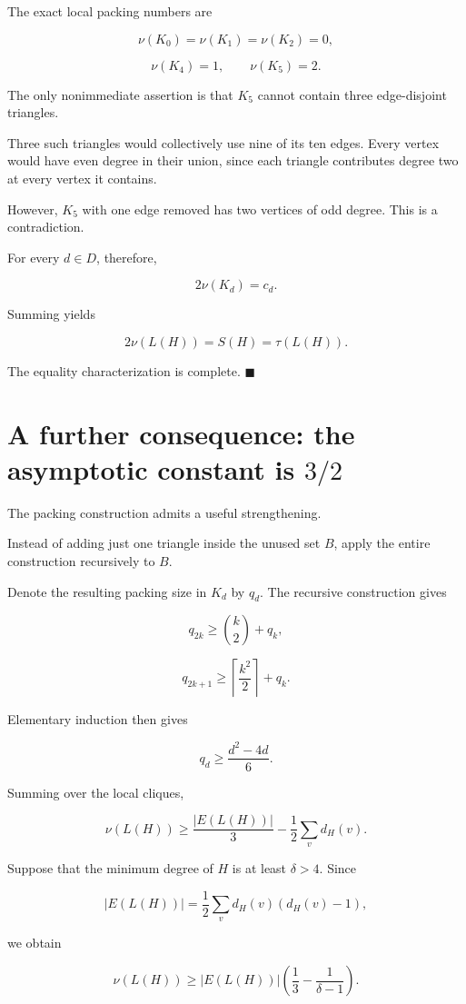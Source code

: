 \documentclass[11pt]{article}
\begin{document}
The exact local packing numbers are

\[
\nu(K_0)=\nu(K_1)=\nu(K_2)=0,
\]

\[
\nu(K_4)=1,\qquad \nu(K_5)=2.
\]

The only nonimmediate assertion is that \(K_5\) cannot contain three edge-disjoint triangles.

Three such triangles would collectively use nine of its ten edges. Every vertex would have even degree in their union, since each triangle contributes degree two at every vertex it contains.

However, \(K_5\) with one edge removed has two vertices of odd degree. This is a contradiction.

For every \(d\in D\), therefore,

\[
2\nu(K_d)=c_d.
\]

Summing yields

\[
2\nu(L(H))=S(H)=\tau(L(H)).
\]

The equality characterization is complete. \(\blacksquare\)

\section{A further consequence: the asymptotic constant is \(3/2\)}

The packing construction admits a useful strengthening.

Instead of adding just one triangle inside the unused set \(B\), apply the entire construction recursively to \(B\).

Denote the resulting packing size in \(K_d\) by \(q_d\). The recursive construction gives

\[
q_{2k}\geq\binom{k}{2}+q_k,
\]

\[
q_{2k+1}\geq
\left\lceil\frac{k^2}{2}\right\rceil+q_k.
\]

Elementary induction then gives

\[
q_d\geq\frac{d^2-4d}{6}.
\]

Summing over the local cliques,

\[
\nu(L(H))\geq
\frac{|E(L(H))|}{3}
-\frac12\sum_v d_H(v).
\]

Suppose that the minimum degree of \(H\) is at least \(\delta>4\). Since

\[
|E(L(H))|
=\frac12\sum_v d_H(v)(d_H(v)-1),
\]

we obtain

\[
\nu(L(H))\geq
|E(L(H))|
\left(\frac13-\frac1{\delta-1}\right).
\]
\end{document}
